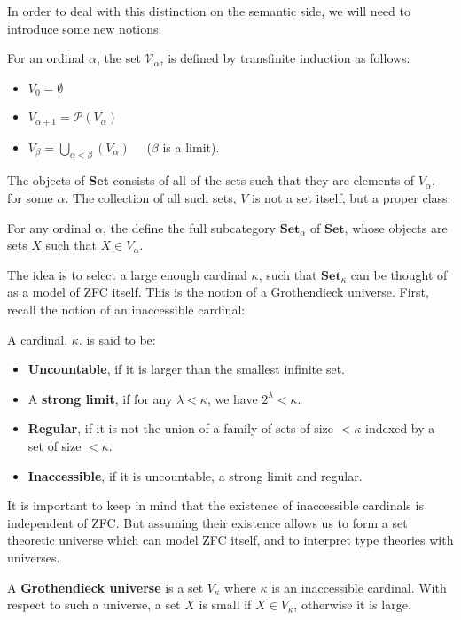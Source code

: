 In order to deal with this distinction on the semantic side, we will need to introduce some new notions:
\begin{defn}For an ordinal $\alpha$, the set $\mathcal{V}_{\alpha}$, is defined by transfinite induction as follows:
  \begin{itemize}
  \item $V_0 = \emptyset$
  \item $V_{\alpha + 1} = \mathcal{P}(V_\alpha)$
  \item $V_{\beta} = \bigcup_{\alpha < \beta}(V_\alpha) \quad $ ($\beta$ is a limit).
  \end{itemize}
\end{defn}
The objects of $\mathbf{Set}$ consists of all of the sets such that they are elements of $V_\alpha$, for some $\alpha$. The collection of all such sets, $V$ is not a set itself, but a proper class.
\begin{defn}
  For any ordinal $\alpha$, the define the full subcategory $\mathbf{Set}_\alpha$ of $\mathbf{Set}$, whose objects are sets $X$ such that $X \in V_\alpha$. 
\end{defn}
The idea is to select a large enough cardinal $\kappa$, such that $\mathbf{Set}_\kappa$ can be thought of as a model of ZFC itself. This is the notion of a Grothendieck universe. First, recall the notion of an inaccessible cardinal:
\begin{defn}A cardinal, $\kappa$. is said to be:
  \begin{itemize}
  \item \textbf{Uncountable}, if it is larger than the smallest infinite set.
  \item A \textbf{strong limit}, if for any $\lambda < \kappa$, we have $2^\lambda < \kappa$.
  \item \textbf{Regular}, if it is not the union of a family of sets of size  $<\kappa$ indexed by a set of size $< \kappa$.
  \item \textbf{Inaccessible}, if it is uncountable, a strong limit and regular.
  \end{itemize}
\end{defn}
It is important to keep in mind that the existence of inaccessible cardinals is independent of ZFC. But assuming their existence allows us to form a set theoretic universe which can model ZFC itself, and to interpret type theories with universes.
\begin{defn}A \textbf{Grothendieck universe} is a set $V_\kappa$ where $\kappa$ is an inaccessible cardinal. With respect to such a universe, a set $X$ is small if $X \in V_\kappa$, otherwise it is large.
\end{defn}
